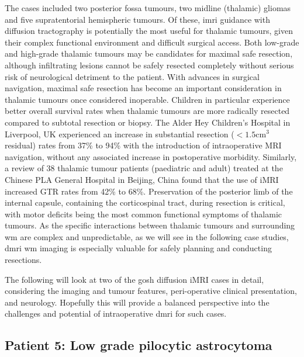 The cases included two posterior fossa tumours, two midline (thalamic) gliomas and five supratentorial hemispheric tumours.
Of these, \gls{imri} guidance with diffusion tractography is potentially the most useful for thalamic tumours, given their complex functional environment and difficult surgical access.
Both low-grade \autocite{Wong2016} and high-grade\autocite{Dorfer2021} thalamic tumours may be candidates for maximal safe resection, although infiltrating lesions cannot be safely resected completely without serious risk of neurological detriment to the patient.
With advances in surgical navigation, maximal safe resection has become an important consideration in thalamic tumours once considered inoperable\autocite{Souweidane1996,Puget2007,Steinbok2016,Grewal2019,Sunderland2021}.
Children in particular\autocite{Ferroli2023} experience better overall survival rates when thalamic tumours are more radically resected compared to subtotal resection or biopsy\autocite{Cinalli2018}.
The Alder Hey Children's Hospital in Liverpool, UK experienced an increase in substantial resection ($<1.5$cm$^3$ residual) rates from 37\% to 94\% with the introduction of intraoperative MRI navigation, without any associated increase in postoperative morbidity\autocite{Sunderland2021}.
Similarly, a review of 38 thalamic tumour patients (paediatric and adult) treated at the Chinese PLA General Hospital in Beijing, China found that the use of iMRI increased GTR rates from 42\% to 68\%.\autocite{Zheng2016}
Preservation of the posterior limb of the internal capsule, containing the corticospinal tract, during resection is critical, with motor deficits being the most common functional symptoms of thalamic tumours\autocite{Puget2007, Zheng2016, Palmisciano2021}.
As the specific interactions between thalamic tumours and surrounding \gls{wm} are complex and unpredictable, as we will see in the following case studies, \gls{dmri} \gls{wm} imaging is especially valuable for safely planning and conducting resections\autocite{Celtikci2017}.

The following will look at two of the \gls{gosh} diffusion iMRI cases in detail, considering the imaging and tumour features, peri-operative clinical presentation, and neurology.
Hopefully this will provide a balanced perspective into the challenges and potential of intraoperative \gls{dmri} for such cases.

\subsection{Patient 5: Low grade pilocytic astrocytoma}

